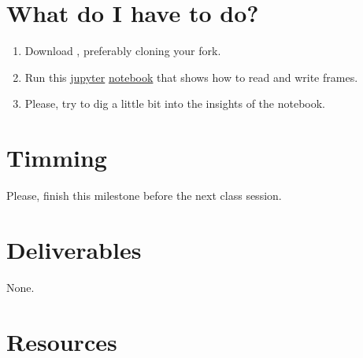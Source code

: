 \section{What do I have to do?}

\begin{enumerate}
\item Download \theproject{}, preferably cloning your fork.
\item Run this \href{https://jupyter.org/}{jupyter}
  \href{https://github.com/Sistemas-Multimedia/Sistemas-Multimedia.github.io/blob/master/milestone/04-the_data/display_video.ipynb}{notebook}
  that shows how to read and write frames.
\item Please, try to dig a little bit into the insights of the notebook.
\end{enumerate}

\section{Timming}

Please, finish this milestone before the next class session.

\section{Deliverables}

None.

\section{Resources}

\renewcommand{\addcontentsline}[3]{}%

